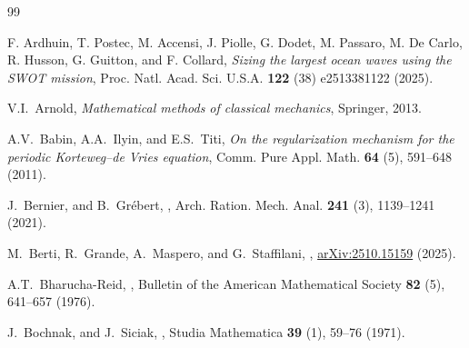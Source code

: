 \documentclass[a4paper,10pt,reqno]{article}
\theoremstyle{definition}
\theoremstyle{plain}
\theoremstyle{plain}
\theoremstyle{definition}
\theoremstyle{plain}
\theoremstyle{plain}
\theoremstyle{plain}
\theoremstyle{definition}
\theoremstyle{definition}
\begin{document}
{\small
\begin{thebibliography}{99}

{\sc F. Ardhuin, T. Postec, M. Accensi, J. Piolle, G. Dodet, M. Passaro, M. De Carlo, R. Husson, G. Guitton, and F. Collard},
{\it Sizing the largest ocean waves using the SWOT mission}, Proc. Natl. Acad. Sci. U.S.A. {\bf 122} (38) e2513381122 (2025).

{\sc V.I.~Arnold}, {\it Mathematical methods of classical mechanics}, Springer, 2013.

{\sc A.V.~Babin, A.A.~Ilyin, and E.S.~Titi}, {\it On the regularization mechanism for the periodic Korteweg–de Vries equation}, Comm. Pure Appl. Math. {\bf 64} (5), 591--648 (2011).

{\sc J.~Bernier, and B.~Grébert},
,
\newblock Arch. Ration. Mech. Anal. {\bf 241} (3), 1139--1241 (2021).

{\sc M.~Berti, R.~Grande, A.~Maspero, and G.~Staffilani},
, \href{https://arxiv.org/abs/2510.15159}{arXiv:2510.15159} (2025).

{\sc A.T.~Bharucha-Reid},
,
\newblock Bulletin of the American Mathematical Society {\bf 82} (5), 641--657 (1976).

{\sc J.~Bochnak, and J.~Siciak},
,
\newblock Studia Mathematica {\bf 39} (1), 59--76  (1971).





\end{thebibliography}}
\end{document}
